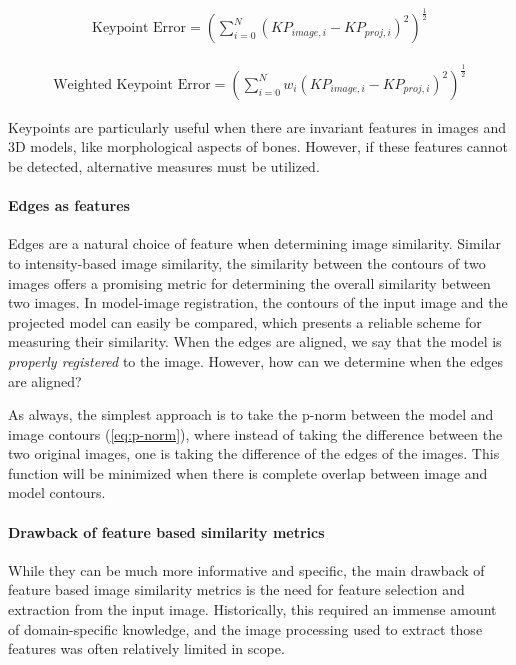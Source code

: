 \begin{equation}
    \begin{aligned}
        \text{Keypoint Error}= (\sum_{i = 0}^{N}(KP_{image,i} - KP_{proj,i})^2)^{\frac{1}{2}}
    \end{aligned}
    \label{eq:kp-error}
\end{equation}

\begin{equation}
    \begin{aligned}
        \text{Weighted Keypoint Error} = (\sum_{i = 0}^{N}w_{i}(KP_{image,i} - KP_{proj,i})^2)^{\frac{1}{2}}
    \end{aligned}
    \label{eq:wkp-error}
\end{equation}

Keypoints are particularly useful when there are invariant features in images and 3D models, like morphological aspects of bones.
However, if these features cannot be detected, alternative measures must be utilized.

\paragraph*{Edges as features}
Edges are a natural choice of feature when determining image similarity.
Similar to intensity-based image similarity, the similarity between the contours of two images offers a promising metric for determining the overall similarity between two images.
In model-image registration, the contours of the input image and the projected model can easily be compared, which presents a reliable scheme for measuring their similarity.
When the edges are aligned, we say that the model is \textit{properly registered} to the image.
However, how can we determine when the edges are aligned?

As always, the simplest approach is to take the p-norm between the model and image contours (\cref{eq:p-norm}), where instead of taking the difference between the two original images, one is taking the difference of the edges of the images.
This function will be minimized when there is complete overlap between image and model contours.

\paragraph{Drawback of feature based similarity metrics}
While they can be much more informative and specific, the main drawback of feature based image similarity metrics is the need for feature selection and extraction from the input image.
Historically, this required an immense amount of domain-specific knowledge, and the image processing used to extract those features was often relatively limited in scope.


